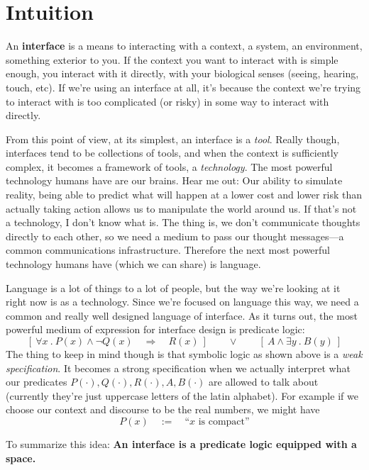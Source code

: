 \documentclass[twoside]{article}
\newcommand{\then}{\ensuremath{\quad\Longrightarrow\quad}}
\begin{document}
\section*{Intuition} %

An {\bf interface} is a means to interacting with a context, a system, an environment, something exterior to you.
If the context you want to interact with is simple enough, you interact with it directly, with your biological senses
(seeing, hearing, touch, etc). If we're using an interface at all, it's because the context we're trying
to interact with is too complicated (or risky) in some way to interact with directly.

From this point of view, at its simplest, an interface is a \emph{tool}. Really though, interfaces tend to be collections of tools,
and when the context is sufficiently complex, it becomes a framework of tools, a \emph{technology}. The most powerful technology
humans have are our brains. Hear me out: Our ability to simulate reality, being able to predict what will happen at a lower cost
and lower risk than actually taking action allows us to manipulate the world around us. If that's not a technology, I don't know
what is. The thing is, we don't communicate thoughts directly to each other, so we need a medium to pass our thought messages---a
common communications infrastructure. Therefore the next most powerful technology humans have (which we can share) is language.

Language is a lot of things to a lot of people, but the way we're looking at it right now is as a technology.
Since we're focused on language this way, we need a common and really well designed language of interface.
As it turns out, the most powerful medium of expression for interface design is predicate logic:
$$ [\ \forall x\ .\ P(x)\wedge\neg Q(x)\then R(x)\ ] \qquad\vee\qquad [\ A\wedge\exists y\ .\ B(y)\ ] $$
The thing to keep in mind though is that symbolic logic as shown above is a \emph{weak specification}.
It becomes a strong specification when we actually interpret what our predicates $ P(\cdot), Q(\cdot), R(\cdot), A, B(\cdot) $
are allowed to talk about (currently they're just uppercase letters of the latin alphabet).
For example if we choose our context and discourse to be the real numbers, we might have
$$ P(x)\quad:=\quad\mbox{``} x \mbox{ is compact''} $$

To summarize this idea: {\bf An interface is a predicate logic equipped with a space.}
\end{document}

